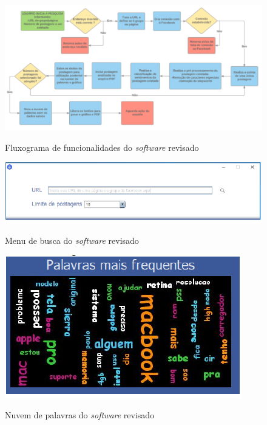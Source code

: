 \begin{figure}[!h]
\centering 
\caption{Fluxograma de funcionalidades do \textit{software} revisado}
\includegraphics[scale=0.44]{imagens/fluxofilipe.png}
\label{fig:fluxotccfilipe}
\end{figure}

\begin{figure}[!h]
\centering 
\caption{Menu de busca do \textit{software} revisado}
\includegraphics[scale=0.6]{imagens/menudebuscafilipe.png}
\label{fig:menutccfilipe}
\end{figure}

\begin{figure}[!h]
\centering 
\caption{Nuvem de palavras do \textit{software} revisado}
\includegraphics[scale=0.62]{imagens/nuvemdepalavras.png}
\label{fig:nuvemtccfilipe}
\end{figure}

